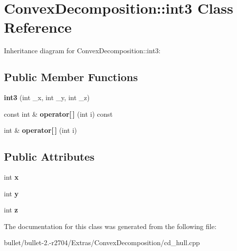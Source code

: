 \hypertarget{class_convex_decomposition_1_1int3}{\section{Convex\+Decomposition\+:\+:int3 Class Reference}
\label{class_convex_decomposition_1_1int3}
}


Inheritance diagram for Convex\+Decomposition\+:\+:int3\+:
\subsection*{Public Member Functions}
\begin{DoxyCompactItemize}
\item 
\hypertarget{class_convex_decomposition_1_1int3_a2e2ad0db26d35109829254823e7e1284}{{\bfseries int3} (int \+\_\+x, int \+\_\+y, int \+\_\+z)}\label{class_convex_decomposition_1_1int3_a2e2ad0db26d35109829254823e7e1284}

\item 
\hypertarget{class_convex_decomposition_1_1int3_a77706f88a6165e88d4f37c34673d2609}{const int \& {\bfseries operator\mbox{[}$\,$\mbox{]}} (int i) const }\label{class_convex_decomposition_1_1int3_a77706f88a6165e88d4f37c34673d2609}

\item 
\hypertarget{class_convex_decomposition_1_1int3_a951b99e97147f6d9b0660496e18f51bb}{int \& {\bfseries operator\mbox{[}$\,$\mbox{]}} (int i)}\label{class_convex_decomposition_1_1int3_a951b99e97147f6d9b0660496e18f51bb}

\end{DoxyCompactItemize}
\subsection*{Public Attributes}
\begin{DoxyCompactItemize}
\item 
\hypertarget{class_convex_decomposition_1_1int3_ac41ef55ce5b1497b6874d0b946fe1dc5}{int {\bfseries x}}\label{class_convex_decomposition_1_1int3_ac41ef55ce5b1497b6874d0b946fe1dc5}

\item 
\hypertarget{class_convex_decomposition_1_1int3_a49d6cd823d05c1b47cd62e30da6f804d}{int {\bfseries y}}\label{class_convex_decomposition_1_1int3_a49d6cd823d05c1b47cd62e30da6f804d}

\item 
\hypertarget{class_convex_decomposition_1_1int3_ac5a12890d701f88312dd3c0138ff697a}{int {\bfseries z}}\label{class_convex_decomposition_1_1int3_ac5a12890d701f88312dd3c0138ff697a}

\end{DoxyCompactItemize}


The documentation for this class was generated from the following file\+:\begin{DoxyCompactItemize}
\item 
bullet/bullet-\/2.-\/r2704/\+Extras/\+Convex\+Decomposition/cd\+\_\+hull.\+cpp\end{DoxyCompactItemize}
